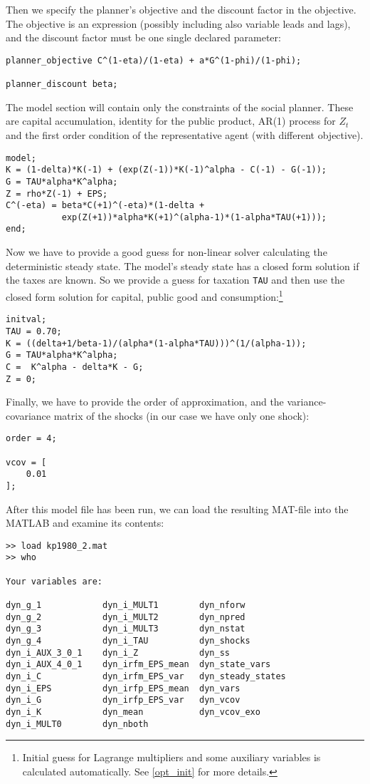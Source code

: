 \documentclass[10pt]{article}
\begin{document}
Then we specify the planner's objective and the discount factor in the
objective. The objective is an expression (possibly including also
variable leads and lags), and the discount factor must be one single
declared parameter:
{\small
\begin{verbatim}
planner_objective C^(1-eta)/(1-eta) + a*G^(1-phi)/(1-phi);

planner_discount beta;
\end{verbatim}
}

The model section will contain only the constraints of the social
planner. These are capital accumulation, identity for the public
product, AR(1) process for $Z_t$ and the first order condition of the
representative agent (with different objective).
{\small
\begin{verbatim}
model;
K = (1-delta)*K(-1) + (exp(Z(-1))*K(-1)^alpha - C(-1) - G(-1));
G = TAU*alpha*K^alpha;
Z = rho*Z(-1) + EPS;
C^(-eta) = beta*C(+1)^(-eta)*(1-delta +
           exp(Z(+1))*alpha*K(+1)^(alpha-1)*(1-alpha*TAU(+1)));
end;
\end{verbatim}
}

Now we have to provide a good guess for non-linear solver calculating
the deterministic steady state. The model's steady state has a closed
form solution if the taxes are known. So we provide a guess for
taxation {\tt TAU} and then use the closed form solution for capital,
public good and consumption:\footnote{Initial guess for Lagrange
multipliers and some auxiliary variables is calculated automatically. See
\ref{opt_init} for more details.}
{\small
\begin{verbatim}
initval;
TAU = 0.70;
K = ((delta+1/beta-1)/(alpha*(1-alpha*TAU)))^(1/(alpha-1));
G = TAU*alpha*K^alpha;
C =  K^alpha - delta*K - G;
Z = 0;
\end{verbatim}
}

Finally, we have to provide the order of approximation, and the
variance-covariance matrix of the shocks (in our case we have only one
shock):
{\small
\begin{verbatim}
order = 4;

vcov = [
	0.01
];
\end{verbatim}
}

After this model file has been run, we can load the resulting MAT-file
into the MATLAB and examine its contents:
{\small
\begin{verbatim}
>> load kp1980_2.mat
>> who

Your variables are:

dyn_g_1            dyn_i_MULT1        dyn_nforw          
dyn_g_2            dyn_i_MULT2        dyn_npred          
dyn_g_3            dyn_i_MULT3        dyn_nstat          
dyn_g_4            dyn_i_TAU          dyn_shocks         
dyn_i_AUX_3_0_1    dyn_i_Z            dyn_ss             
dyn_i_AUX_4_0_1    dyn_irfm_EPS_mean  dyn_state_vars     
dyn_i_C            dyn_irfm_EPS_var   dyn_steady_states  
dyn_i_EPS          dyn_irfp_EPS_mean  dyn_vars           
dyn_i_G            dyn_irfp_EPS_var   dyn_vcov           
dyn_i_K            dyn_mean           dyn_vcov_exo       
dyn_i_MULT0        dyn_nboth          
\end{verbatim}
}
\end{document}
